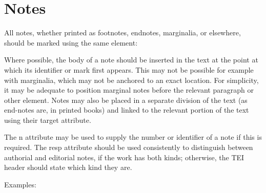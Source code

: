 \documentclass[11pt,twoside]{article}\makeatletter
\makeatletter
\renewcommand\section{\@startsection {section}{1}{\z@}%
     {-1.75ex \@plus -0.5ex \@minus -.2ex}%
     {0.5ex \@plus .2ex}%
     {\reset@font\Large\bfseries\sffamily}}
\def\DivI{\section}
\def\DivI{\chapter}
\makeatother
\begin{document}
\DivI[Notes]{Notes}\label{U5-notes}\par All notes, whether printed as footnotes, endnotes, marginalia, or
elsewhere, should be marked using the same element:


Where possible, the body of a note should be inserted in the
text at the point at which its identifier or mark first appears. This
may not be possible for example with marginalia, which may not be
anchored to an exact location.  For simplicity, it may be adequate to
position marginal notes before the relevant paragraph or other
element.  Notes may also be placed in a separate division of the text
(as end-notes are, in printed books) and linked to the relevant
portion of the text using their target attribute.\par The n attribute may be used to supply the number
or identifier of a note if this is required.  The resp
attribute should be used consistently to distinguish between authorial
and editorial notes, if the work has both kinds; otherwise, the TEI
header should state which kind they are.\par Examples:
\end{document}
